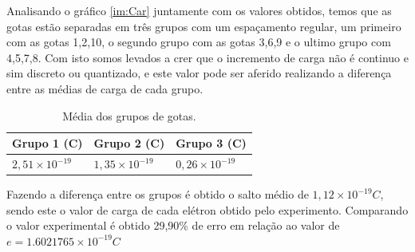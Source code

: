 Analisando o gráfico \ref{im:Car} juntamente com os valores obtidos, temos que as gotas estão separadas em três grupos com um espaçamento regular, um primeiro com as gotas 1,2,10, o segundo grupo com as gotas 3,6,9 e o ultimo grupo com 4,5,7,8. Com isto somos levados a crer que o incremento de carga não é continuo e sim discreto ou quantizado, e este valor pode ser aferido realizando a diferença entre as médias de carga de cada grupo.

\begin{table}[!htb]
\centering
\begin{tabular}{l|l|l|}
Grupo 1 (C)            & Grupo 2 (C)            & Grupo 3 (C)             \\ \hline
\rowcolor[HTML]{C0C0C0} 
$2,51 \times 10^{-19}$ & $1,35 \times 10^{-19}$ & $0,26  \times 10^{-19}$ \\ \hline
\end{tabular}
\caption{Média dos grupos de gotas.}

\end{table}
Fazendo a diferença entre os grupos é obtido o salto médio de $1,12 \times 10^{-19} C$, sendo este o valor de carga de cada elétron obtido pelo experimento. Comparando o valor experimental é obtido 29,90\% de erro em relação ao valor de $e = 1.6021765 \times 10^{-19} C$
